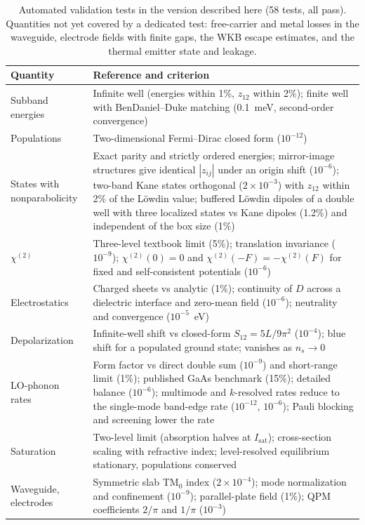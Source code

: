 \documentclass[11pt]{article}
\newcommand{\chitwo}{\chi^{(2)}}
\begin{document}
\begin{table}[tp]
\centering\small
\caption{Automated validation tests in the version described here (58 tests, all pass). Quantities not yet covered by a dedicated test: free-carrier and metal losses in the waveguide, electrode fields with finite gaps, the WKB escape estimates, and the thermal emitter state and leakage.}\label{tab:val}
\begin{tabularx}{\textwidth}{@{}lX@{}}
\toprule
Quantity & Reference and criterion \\ \midrule
Subband energies & Infinite well (energies within 1\%, $z_{12}$ within 2\%); finite well with BenDaniel--Duke matching (0.1~meV, second-order convergence) \\
Populations & Two-dimensional Fermi--Dirac closed form ($10^{-12}$) \\
States with nonparabolicity & Exact parity and strictly ordered energies; mirror-image structures give identical $|z_{ij}|$ under an origin shift ($10^{-6}$); two-band Kane states orthogonal ($2\times10^{-3}$) with $z_{12}$ within 2\% of the L\"owdin value; buffered L\"owdin dipoles of a double well with three localized states vs Kane dipoles (1.2\%) and independent of the box size (1\%) \\
$\chitwo$ & Three-level textbook limit \cite{Vurgaftman2021} (5\%); translation invariance ($10^{-9}$); $\chitwo(0)=0$ and $\chitwo(-F)=-\chitwo(F)$ for fixed and self-consistent potentials ($10^{-6}$) \\
Electrostatics & Charged sheets vs analytic (1\%); continuity of $D$ across a dielectric interface and zero-mean field ($10^{-6}$); neutrality and convergence ($10^{-5}$~eV) \\
Depolarization & Infinite-well shift vs closed-form $S_{12}=5L/9\pi^2$ ($10^{-4}$); blue shift for a populated ground state; vanishes as $n_s\to0$ \\
LO-phonon rates & Form factor vs direct double sum ($10^{-9}$) and short-range limit (1\%); published GaAs benchmark (15\%); detailed balance ($10^{-6}$); multimode and $k$-resolved rates reduce to the single-mode band-edge rate ($10^{-12}$, $10^{-6}$); Pauli blocking and screening lower the rate \\
Saturation & Two-level limit (absorption halves at $I_\mathrm{sat}$); cross-section scaling with refractive index; level-resolved equilibrium stationary, populations conserved \\
Waveguide, electrodes & Symmetric slab TM$_0$ index ($2\times10^{-4}$); mode normalization and confinement ($10^{-9}$); parallel-plate field (1\%); QPM coefficients $2/\pi$ and $1/\pi$ ($10^{-3}$) \\

\end{tabularx}
\end{table}
\end{document}
